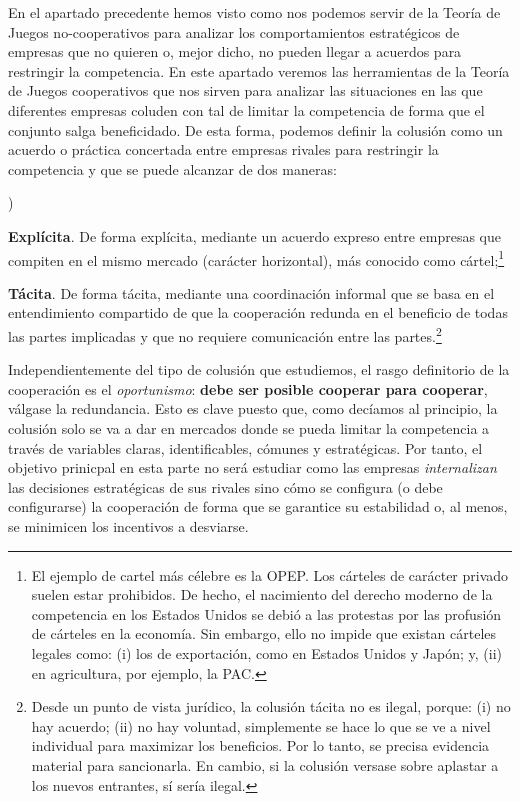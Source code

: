 \documentclass[10pt,a4paper]{article}
\newcounter{alphaitem}
\newenvironment{la}
      {\begin{list}{\alph{alphaitem})}{%
          \usecounter{alphaitem}%
          \setlength{\leftmargin}{1cm}%
          \setlength{\parskip}{3pt}%
          \setlength{\itemsep}{0pt}%
          \setlength{\parsep}{0pt}%
      }}
      {\end{list}}
\begin{document}
En el apartado precedente hemos visto como nos podemos servir de la Teoría de Juegos no-cooperativos para analizar los comportamientos estratégicos de empresas que no quieren o, mejor dicho, no pueden llegar a acuerdos para restringir la competencia. En este apartado veremos las herramientas de la Teoría de Juegos cooperativos que nos sirven para analizar las situaciones en las que diferentes empresas coluden con tal de limitar la competencia de forma que el conjunto salga beneficidado. De esta forma, podemos definir la colusión como un acuerdo o práctica concertada entre empresas rivales para restringir la competencia y que se puede alcanzar de dos maneras:
\begin{la}
    \item \textbf{Explícita}. De forma explícita, mediante un acuerdo expreso entre empresas que compiten en el mismo mercado (carácter horizontal), más conocido como cártel;\footnote{%
        El ejemplo de cartel más célebre es la OPEP. Los cárteles de carácter privado suelen estar prohibidos. De hecho, el nacimiento del derecho moderno de la competencia en los Estados Unidos se debió a las protestas por las profusión de cárteles en la economía. Sin embargo, ello no impide que existan cárteles legales como: (i) los de exportación, como en Estados Unidos y Japón; y, (ii) en agricultura, por ejemplo, la PAC.
    }
    \item \textbf{Tácita}. De forma tácita, mediante una coordinación informal que se basa en el entendimiento compartido de que la cooperación redunda en el beneficio de todas las partes implicadas y que no requiere comunicación entre las partes.\footnote{%
        Desde un punto de vista jurídico, la colusión tácita no es ilegal, porque: (i) no hay acuerdo; (ii) no hay voluntad, simplemente se hace lo que se ve a nivel individual para maximizar los beneficios. Por lo tanto, se precisa evidencia material para sancionarla. En cambio, si la colusión versase sobre aplastar a los nuevos entrantes, sí sería ilegal.
    }
\end{la}

Independientemente del tipo de colusión que estudiemos, el rasgo definitorio de la cooperación es el \textit{oportunismo}: \textbf{debe ser posible cooperar para cooperar}, válgase la redundancia. Esto es clave puesto que, como decíamos al principio, la colusión solo se va a dar en mercados donde se pueda limitar la competencia a través de variables claras, identificables, cómunes y estratégicas. Por tanto, el objetivo prinicpal en esta parte no será estudiar como las empresas \textit{internalizan} las decisiones estratégicas de sus rivales sino cómo se configura (o debe configurarse) la cooperación de forma que se garantice su estabilidad o, al menos, se minimicen los incentivos a desviarse. 
\end{document}
